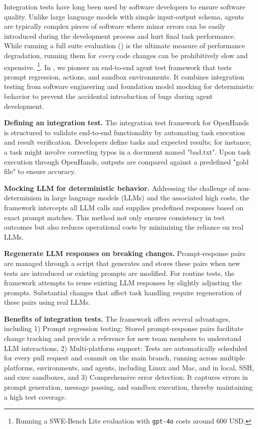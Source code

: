 Integration tests \cite{DBLP:conf/icsm/LeungW90} have long been used by software developers to ensure software quality. Unlike large language models with simple input-output schema, agents are typically complex pieces of software where minor errors can be easily introduced during the development process and hurt final task performance.
While running a full suite evaluation () is the ultimate measure of performance degradation, running them for \textit{every} code changes can be prohibitively slow and expensive.
\footnote{Running a SWE-Bench Lite \cite{jimenez2024swebench} evaluation with \texttt{gpt-4o} costs around 600 USD.}.
In \projname, we pioneer an end-to-end agent test framework that tests prompt regression, actions, and sandbox environments.
It combines integration testing from software engineering and foundation model mocking for deterministic behavior to prevent the accidental introduction of bugs during agent development. 


\noindent \textbf{Defining an integration test.}
The integration test framework for OpenHands is structured to validate end-to-end functionality by automating task execution and result verification. Developers define tasks and expected results; for instance, a task might involve correcting typos in a document named "bad.txt". Upon task execution through OpenHands, outputs are compared against a predefined "gold file" to ensure accuracy.

\noindent \textbf{Mocking LLM for deterministic behavior.}
Addressing the challenge of non-determinism in large language models (LLMs) and the associated high costs, the framework intercepts all LLM calls and supplies predefined responses based on exact prompt matches. This method not only ensures consistency in test outcomes but also reduces operational costs by minimizing the reliance on real LLMs.

\noindent \textbf{Regenerate LLM responses on breaking changes.}
Prompt-response pairs are managed through a script that generates and stores these pairs when new tests are introduced or existing prompts are modified. For routine tests, the framework attempts to reuse existing LLM responses by slightly adjusting the prompts. Substantial changes that affect task handling require regeneration of these pairs using real LLMs.

\noindent \textbf{Benefits of integration tests.}
The framework offers several advantages, including 1) Prompt regression testing: Stored prompt-response pairs facilitate change tracking and provide a reference for new team members to understand LLM interactions, 2) Multi-platform support: Tests are automatically scheduled for every pull request and commit on the main branch, running across multiple platforms, environments, and agents, including Linux and Mac, and in local, SSH, and exec sandboxes, and 3) Comprehensive error detection: It captures errors in prompt generation, message passing, and sandbox execution, thereby maintaining a high test coverage.

